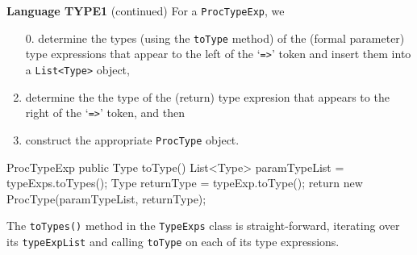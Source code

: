 \begin{minipage}[t]{\sw}
\slidenumber
\LARGE
{\bf Language TYPE1} (continued)\exx
For a \verb'ProcTypeExp', we\
\begin{enumerate}
\item[0.] determine the types (using the \verb'toType' method)
of the (formal parameter) type expressions
that appear to the left of the `\verb'=>'' token
and insert them into a \verb'List<Type>' object,
\item determine the the type of the (return) type expresion that appears
to the right of the `\verb'=>'' token, and then
\item
construct the appropriate \verb'ProcType' object.
\end{enumerate}
{\Large
\begin{qv}
ProcTypeExp
    public Type toType() {
        List<Type> paramTypeList = typeExps.toTypes();
        Type returnType = typeExp.toType();
        return new ProcType(paramTypeList, returnType);
    }
\end{qv}
}
The \verb'toTypes()' method in the \verb'TypeExps' class
is straight-forward,
iterating over its \verb'typeExpList'
and calling \verb'toType' on each of its type expressions.
\end{minipage}
